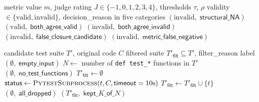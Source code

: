 \begin{algorithm}[htbp]
\caption{Closure validity decision (implements Eqs.~\ref{eq:valid1}--\ref{eq:valid3}).}
\label{alg:validity}
\begin{algorithmic}[1]
\Require metric value $m$, judge rating $J \in \{-1, 0, 1, 2, 3, 4\}$, thresholds $\tau$, $\rho$
\Ensure validity $\in \{\text{valid}, \text{invalid}\}$, \textsf{decision\_reason} in five categories
  \State \Return $(\text{invalid},\; \textsf{structural\_NA})$ 
\EndIf
{}
  \State \Return $(\text{valid},\; \textsf{both\_agree\_valid})$
  \State \Return $(\text{invalid},\; \textsf{both\_agree\_invalid})$
  \State \Return $(\text{invalid},\; \textsf{false\_closure\_candidate})$ 
\Else {}
  \State \Return $(\text{invalid},\; \textsf{metric\_false\_negative})$ 
\EndIf
\end{algorithmic}
\end{algorithm}


\begin{algorithm}[htbp]
\caption{Test-filter validity gate (implements Eq.~\ref{eq:filter}).}
\label{alg:test_filter}
\begin{algorithmic}[1]
\Require candidate test suite $T'$, original code $C$
\Ensure filtered suite $T'_{\textsf{filt}} \subseteq T'$, \textsf{filter\_reason} label
  \State \Return $(\emptyset,\; \textsf{empty\_input})$
\EndIf
\State $N \gets$ number of \texttt{def test\_*} functions in $T'$
  \State \Return $(\emptyset,\; \textsf{no\_test\_functions})$
\EndIf
\State $T'_{\textsf{filt}} \gets \emptyset$
  \State $\textsf{status} \gets \textsc{PytestSubprocess}(t, C, \textsf{timeout} = 10\text{s})$
    \State $T'_{\textsf{filt}} \gets T'_{\textsf{filt}} \cup \{t\}$
  \EndIf
\EndFor
{}
  \State \Return $(\emptyset,\; \textsf{all\_dropped})$ 
\EndIf
\State \Return $(T'_{\textsf{filt}},\; \textsf{kept}\_K\_\textsf{of}\_N)$
\end{algorithmic}
\end{algorithm}

